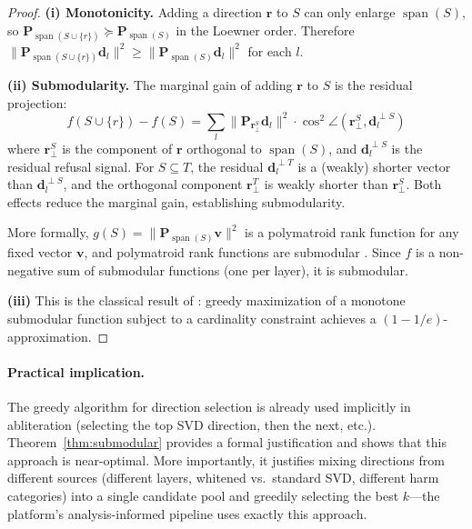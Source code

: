 \begin{proof}
\textbf{(i) Monotonicity.}
Adding a direction $\mathbf{r}$ to $S$ can only enlarge $\operatorname{span}(S)$, so $\mathbf{P}_{\operatorname{span}(S \cup \{r\})} \succeq \mathbf{P}_{\operatorname{span}(S)}$ in the Loewner order.
Therefore $\|\mathbf{P}_{\operatorname{span}(S \cup \{r\})} \mathbf{d}_l\|^2 \geq \|\mathbf{P}_{\operatorname{span}(S)} \mathbf{d}_l\|^2$ for each $l$.

\textbf{(ii) Submodularity.}
The marginal gain of adding $\mathbf{r}$ to $S$ is the residual projection:
\begin{equation}
    f(S \cup \{r\}) - f(S) = \sum_l \|\mathbf{P}_{\mathbf{r}_\perp^S} \mathbf{d}_l\|^2 \cdot \cos^2\angle(\mathbf{r}_\perp^S, \mathbf{d}_l^{\perp S})
\end{equation}
where $\mathbf{r}_\perp^S$ is the component of $\mathbf{r}$ orthogonal to $\operatorname{span}(S)$, and $\mathbf{d}_l^{\perp S}$ is the residual refusal signal.
For $S \subseteq T$, the residual $\mathbf{d}_l^{\perp T}$ is a (weakly) shorter vector than $\mathbf{d}_l^{\perp S}$, and the orthogonal component $\mathbf{r}_\perp^T$ is weakly shorter than $\mathbf{r}_\perp^S$.
Both effects reduce the marginal gain, establishing submodularity.

More formally, $g(S) = \|\mathbf{P}_{\operatorname{span}(S)}\mathbf{v}\|^2$ is a polymatroid rank function for any fixed vector $\mathbf{v}$, and polymatroid rank functions are submodular \citep{edmonds1970submodular}.
Since $f$ is a non-negative sum of submodular functions (one per layer), it is submodular.

\textbf{(iii)} This is the classical result of \citet{nemhauser1978analysis}: greedy maximization of a monotone submodular function subject to a cardinality constraint achieves a $(1-1/e)$-approximation.
\end{proof}

\paragraph{Practical implication.}
The greedy algorithm for direction selection is already used implicitly in abliteration (selecting the top SVD direction, then the next, etc.).
Theorem~\ref{thm:submodular} provides a formal justification and shows that this approach is near-optimal.
More importantly, it justifies mixing directions from different sources (different layers, whitened vs.\ standard SVD, different harm categories) into a single candidate pool and greedily selecting the best $k$---the platform's analysis-informed pipeline uses exactly this approach.


